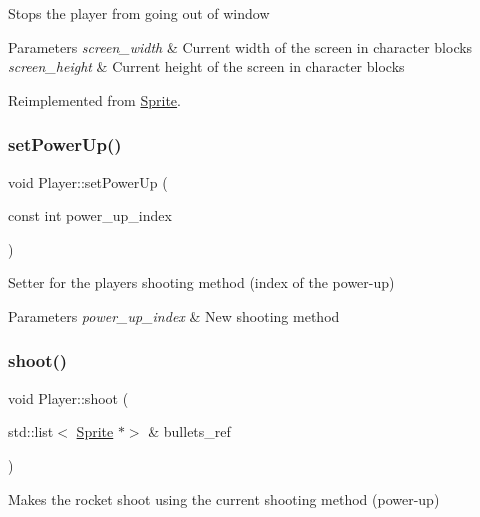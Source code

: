 Stops the player from going out of window


\begin{DoxyParams}{Parameters}
{\em screen\+\_\+width} & Current width of the screen in character blocks \\
\hline
{\em screen\+\_\+height} & Current height of the screen in character blocks \\
\hline
\end{DoxyParams}


Reimplemented from \hyperlink{classSprite_a88935cd050a81898ee3a5693038f1a7a}{Sprite}.

\mbox{\label{classPlayer_a52e8800e4216f0d78c497e90412779d2}} 
\subsubsection{\texorpdfstring{set\+Power\+Up()}{setPowerUp()}}
{\footnotesize\ttfamily void Player\+::set\+Power\+Up (\begin{DoxyParamCaption}\item[{const int}]{power\+\_\+up\+\_\+index }\end{DoxyParamCaption})}

Setter for the player\textquotesingle{}s shooting method (index of the power-\/up)


\begin{DoxyParams}{Parameters}
{\em power\+\_\+up\+\_\+index} & New shooting method \\
\hline
\end{DoxyParams}
\mbox{\label{classPlayer_a5bb630935b83b66406b87149e7087a00}} 
\subsubsection{\texorpdfstring{shoot()}{shoot()}}
{\footnotesize\ttfamily void Player\+::shoot (\begin{DoxyParamCaption}\item[{std\+::list$<$ \hyperlink{classSprite}{Sprite} $\ast$$>$ \&}]{bullets\+\_\+ref }\end{DoxyParamCaption})}



Makes the rocket shoot using the current shooting method (power-\/up) 

